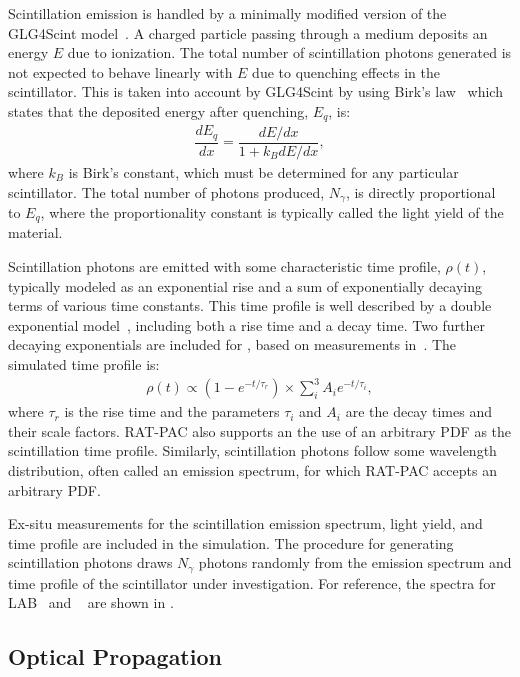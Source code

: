 Scintillation emission is handled by a minimally modified version of the GLG4Scint model~\cite{glg4sim}. 
A charged particle passing through a medium deposits an energy $E$ due to ionization. 
The total number of scintillation photons generated is not expected to behave linearly with $E$ due to quenching effects in the scintillator.
This is taken into account by GLG4Scint by using Birk's law~\cite{birks} which states that the deposited energy after quenching, $E_{q}$, is:
\begin{eqnarray}
	\dfrac{dE_{q}}{dx} = \dfrac{dE/dx}{1+ k_BdE/dx},
    \label{eq:birk}
\end{eqnarray}
where $k_B$ is Birk's constant, which must be determined for any particular scintillator. 
The total number of  photons produced, $N_{\gamma}$, is directly proportional to $E_{q}$, where the proportionality constant is typically called the light yield of the material. 

Scintillation photons are emitted with some characteristic time profile, $\rho(t)$, typically modeled as an exponential rise and a sum of exponentially decaying terms of various time constants.
This time profile is well described by a double exponential model~\cite{mcguire_palmer}, including both a rise time and a decay time. 
Two further decaying exponentials are included for {\labppo}, based on measurements in~\cite{labppo}. The simulated time profile is:
\begin{eqnarray}
\rho(t) \propto (1 - e^{-t/\tau_r}) \times \sum^3_i A_i e^{-t/\tau_i},
\end{eqnarray}
where $\tau_r$ is the rise time and the parameters $\tau_i$ and $A_i$ are the decay times and their scale factors.
RAT-PAC also supports an the use of an arbitrary PDF as the scintillation time profile.
Similarly, scintillation photons follow some wavelength distribution, often called an emission spectrum, for which RAT-PAC accepts an arbitrary PDF.

Ex-situ measurements for the scintillation emission spectrum, light yield, and time profile are included in the simulation. 
The procedure for generating scintillation photons draws $N_{\gamma}$ photons randomly from the emission spectrum and time profile of the scintillator under investigation. 
For reference, the spectra for LAB~\cite{lab_emission} and {\labppo}~\cite{snop_private} are shown in . 


\subsection{Optical Propagation \label{sec:optics}}

